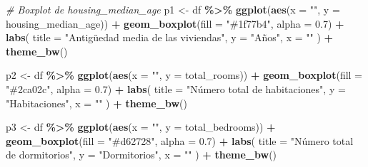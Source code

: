 \documentclass[
]{book}
\newenvironment{Shaded}{\begin{snugshade}}{\end{snugshade}}
\newcommand{\AttributeTok}[1]{\textcolor[rgb]{0.13,0.29,0.53}{#1}}
\newcommand{\CommentTok}[1]{\textcolor[rgb]{0.56,0.35,0.01}{\textit{#1}}}
\newcommand{\FloatTok}[1]{\textcolor[rgb]{0.00,0.00,0.81}{#1}}
\newcommand{\FunctionTok}[1]{\textcolor[rgb]{0.13,0.29,0.53}{\textbf{#1}}}
\newcommand{\NormalTok}[1]{#1}
\newcommand{\OtherTok}[1]{\textcolor[rgb]{0.56,0.35,0.01}{#1}}
\newcommand{\SpecialCharTok}[1]{\textcolor[rgb]{0.81,0.36,0.00}{\textbf{#1}}}
\newcommand{\StringTok}[1]{\textcolor[rgb]{0.31,0.60,0.02}{#1}}
\begin{document}
\begin{Shaded}
\begin{Highlighting}[]
\CommentTok{\# Boxplot de housing\_median\_age}
\NormalTok{p1 }\OtherTok{\textless{}{-}}\NormalTok{ df }\SpecialCharTok{\%\textgreater{}\%}
  \FunctionTok{ggplot}\NormalTok{(}\FunctionTok{aes}\NormalTok{(}\AttributeTok{x =} \StringTok{""}\NormalTok{, }\AttributeTok{y =}\NormalTok{ housing\_median\_age)) }\SpecialCharTok{+}
  \FunctionTok{geom\_boxplot}\NormalTok{(}\AttributeTok{fill =} \StringTok{"\#1f77b4"}\NormalTok{, }\AttributeTok{alpha =} \FloatTok{0.7}\NormalTok{) }\SpecialCharTok{+}
  \FunctionTok{labs}\NormalTok{(}
    \AttributeTok{title =} \StringTok{"Antigüedad media de las viviendas"}\NormalTok{,}
    \AttributeTok{y =} \StringTok{"Años"}\NormalTok{,}
    \AttributeTok{x =} \StringTok{""}
\NormalTok{  ) }\SpecialCharTok{+}
  \FunctionTok{theme\_bw}\NormalTok{()}
\end{Highlighting}
\end{Shaded}

\begin{Shaded}
\begin{Highlighting}[]
\NormalTok{p2 }\OtherTok{\textless{}{-}}\NormalTok{ df }\SpecialCharTok{\%\textgreater{}\%}
  \FunctionTok{ggplot}\NormalTok{(}\FunctionTok{aes}\NormalTok{(}\AttributeTok{x =} \StringTok{""}\NormalTok{, }\AttributeTok{y =}\NormalTok{ total\_rooms)) }\SpecialCharTok{+}
  \FunctionTok{geom\_boxplot}\NormalTok{(}\AttributeTok{fill =} \StringTok{"\#2ca02c"}\NormalTok{, }\AttributeTok{alpha =} \FloatTok{0.7}\NormalTok{) }\SpecialCharTok{+}
  \FunctionTok{labs}\NormalTok{(}
    \AttributeTok{title =} \StringTok{"Número total de habitaciones"}\NormalTok{,}
    \AttributeTok{y =} \StringTok{"Habitaciones"}\NormalTok{,}
    \AttributeTok{x =} \StringTok{""}
\NormalTok{  ) }\SpecialCharTok{+}
  \FunctionTok{theme\_bw}\NormalTok{()}
\end{Highlighting}
\end{Shaded}

\begin{Shaded}
\begin{Highlighting}[]
\NormalTok{p3 }\OtherTok{\textless{}{-}}\NormalTok{ df }\SpecialCharTok{\%\textgreater{}\%}
  \FunctionTok{ggplot}\NormalTok{(}\FunctionTok{aes}\NormalTok{(}\AttributeTok{x =} \StringTok{""}\NormalTok{, }\AttributeTok{y =}\NormalTok{ total\_bedrooms)) }\SpecialCharTok{+}
  \FunctionTok{geom\_boxplot}\NormalTok{(}\AttributeTok{fill =} \StringTok{"\#d62728"}\NormalTok{, }\AttributeTok{alpha =} \FloatTok{0.7}\NormalTok{) }\SpecialCharTok{+}
  \FunctionTok{labs}\NormalTok{(}
    \AttributeTok{title =} \StringTok{"Número total de dormitorios"}\NormalTok{,}
    \AttributeTok{y =} \StringTok{"Dormitorios"}\NormalTok{,}
    \AttributeTok{x =} \StringTok{""}
\NormalTok{  ) }\SpecialCharTok{+}
  \FunctionTok{theme\_bw}\NormalTok{()}
\end{Highlighting}
\end{Shaded}
\end{document}
